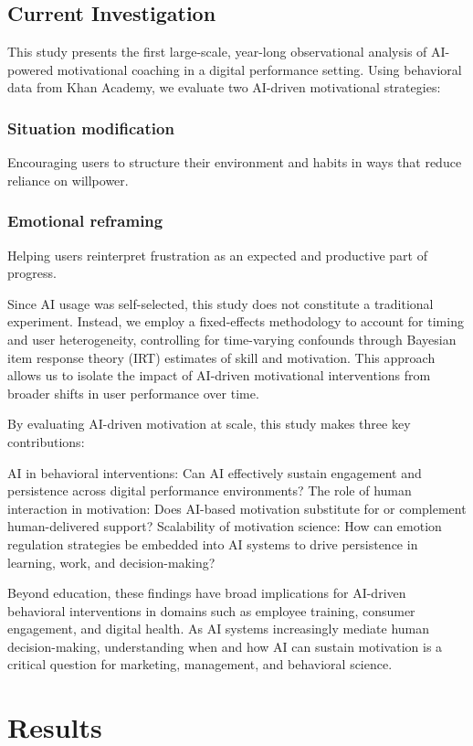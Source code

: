 \documentclass[11pt]{report}
\begin{document}
\begin{mainf}
\subsection{Current Investigation}
This study presents the first large-scale, year-long observational analysis of AI-powered motivational coaching in a digital performance setting. 
Using behavioral data from Khan Academy, we evaluate two AI-driven motivational strategies:

\subsubsection{Situation modification} Encouraging users to structure their environment and habits in ways that reduce reliance on willpower.
\subsubsection{Emotional reframing} Helping users reinterpret frustration as an expected and productive part of progress.
 
Since AI usage was self-selected, this study does not constitute a traditional experiment. 
Instead, we employ a fixed-effects methodology to account for timing and user heterogeneity, controlling for time-varying confounds through Bayesian item response theory (IRT) estimates of skill and motivation. 
This approach allows us to isolate the impact of AI-driven motivational interventions from broader shifts in user performance over time.

By evaluating AI-driven motivation at scale, this study makes three key contributions:

AI in behavioral interventions: Can AI effectively sustain engagement and persistence across digital performance environments?
The role of human interaction in motivation: Does AI-based motivation substitute for or complement human-delivered support?
Scalability of motivation science: How can emotion regulation strategies be embedded into AI systems to drive persistence in learning, work, and decision-making?

Beyond education, these findings have broad implications for AI-driven behavioral interventions in domains such as employee training, consumer engagement, and digital health. 
As AI systems increasingly mediate human decision-making, understanding when and how AI can sustain motivation is a critical question for marketing, management, and behavioral science.

\section{Results} 


\end{mainf}
\end{document}
